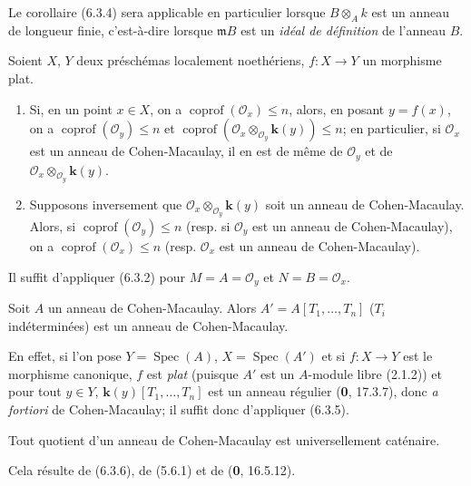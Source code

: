 Le corollaire (6.3.4) sera applicable en particulier lorsque $B\otimes_Ak$ est
un anneau de longueur finie, c'est-à-dire lorsque $\mathfrak mB$ est un \emph{idéal
de définition} de l'anneau $B$.

\begin{corollary}[6.3.5]
\label{IV.2.s6.3.5-fr}
Soient $X$, $Y$ deux préschémas localement noethériens, $f:X\to Y$ un
morphisme plat.
\begin{enumerate}
\item[\textup{(i)}] Si, en un point $x\in X$, on a
$\operatorname{coprof}(\mathcal O_x)\leq n$, alors, en posant $y=f(x)$, on a
$\operatorname{coprof}(\mathcal O_y)\leq n$ et
$\operatorname{coprof}(\mathcal O_x\otimes_{\mathcal O_y}\boldsymbol{k}(y))\leq n$; en
particulier, si $\mathcal O_x$ est un anneau de Cohen-Macaulay, il en est de
même de $\mathcal O_y$ et de
$\mathcal O_x\otimes_{\mathcal O_y}\boldsymbol{k}(y)$.
\item[\textup{(ii)}] Supposons inversement que
$\mathcal O_x\otimes_{\mathcal O_y}\boldsymbol{k}(y)$ soit un anneau de Cohen-Macaulay.
Alors, si $\operatorname{coprof}(\mathcal O_y)\leq n$ \textup{(resp.} si
$\mathcal O_y$ est un anneau de Cohen-Macaulay), on a
$\operatorname{coprof}(\mathcal O_x)\leq n$ \textup{(resp.} $\mathcal O_x$ est un
anneau de Cohen-Macaulay).
\end{enumerate}
\end{corollary}

Il suffit d'appliquer (6.3.2) pour $M=A=\mathcal O_y$ et
$N=B=\mathcal O_x$.

\begin{corollary}[6.3.6]
\label{IV.2.s6.3.6-fr}
Soit $A$ un anneau de Cohen-Macaulay. Alors
$A'=A[T_1,\ldots,T_n]$ ($T_i$ indéterminées) est un anneau de
Cohen-Macaulay.
\end{corollary}

En effet, si l'on pose $Y=\operatorname{Spec}(A)$,
$X=\operatorname{Spec}(A')$ et si $f:X\to Y$ est le morphisme canonique, $f$
est \emph{plat} (puisque $A'$ est un $A$-module libre (2.1.2)) et pour tout $y\in Y$,
$\boldsymbol{k}(y)[T_1,\ldots,T_n]$ est un anneau régulier (\textbf{0}, 17.3.7), donc \emph{a
fortiori} de Cohen-Macaulay; il suffit donc d'appliquer (6.3.5).

\begin{corollary}[6.3.7]
\label{IV.2.s6.3.7-fr}
Tout quotient d'un anneau de Cohen-Macaulay est universellement caténaire.
\end{corollary}

Cela résulte de (6.3.6), de (5.6.1) et de (\textbf{0}, 16.5.12).

